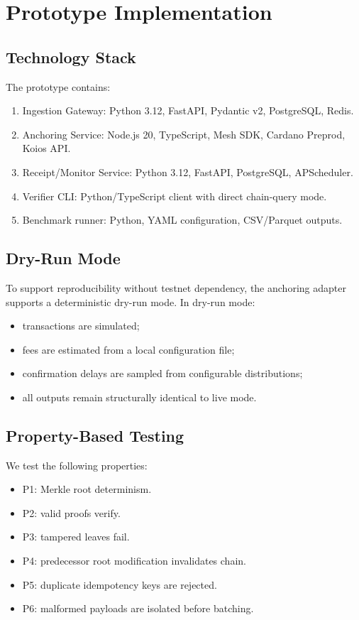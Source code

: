 \documentclass[journal]{IEEEtran}
\begin{document}
\section{Prototype Implementation}
\label{sec:prototype}

\subsection{Technology Stack}
The prototype contains:
\begin{enumerate}[nosep,leftmargin=2em]
    \item Ingestion Gateway: Python 3.12, FastAPI, Pydantic v2, PostgreSQL, Redis.
    \item Anchoring Service: Node.js 20, TypeScript, Mesh SDK, Cardano Preprod, Koios API.
    \item Receipt/Monitor Service: Python 3.12, FastAPI, PostgreSQL, APScheduler.
    \item Verifier CLI: Python/TypeScript client with direct chain-query mode.
    \item Benchmark runner: Python, YAML configuration, CSV/Parquet outputs.
\end{enumerate}

\subsection{Dry-Run Mode}
To support reproducibility without testnet dependency, the anchoring adapter supports a deterministic dry-run mode. In dry-run mode:
\begin{itemize}[nosep,leftmargin=2em]
    \item transactions are simulated;
    \item fees are estimated from a local configuration file;
    \item confirmation delays are sampled from configurable distributions;
    \item all outputs remain structurally identical to live mode.
\end{itemize}

\subsection{Property-Based Testing}
We test the following properties:
\begin{itemize}[nosep,leftmargin=2em]
    \item P1: Merkle root determinism.
    \item P2: valid proofs verify.
    \item P3: tampered leaves fail.
    \item P4: predecessor root modification invalidates chain.
    \item P5: duplicate idempotency keys are rejected.
    \item P6: malformed payloads are isolated before batching.
\end{itemize}
\end{document}
